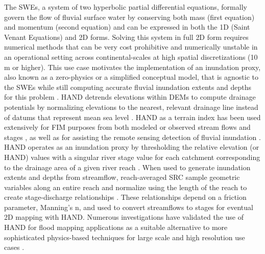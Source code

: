 \documentclass[preprint,review,12pt]{dependencies/elsarticle}
\begin{document}
The \acp{SWE}, a system of two hyperbolic partial differential equations, formally govern the flow of fluvial surface water by conserving both mass (first equation) and momentum (second equation) and can be expressed in both the \ac{1D} (Saint Venant Equations) and \ac{2D} forms.
Solving this system in full \ac{2D} form requires numerical methods that can be very cost prohibitive and numerically unstable in an operational setting across continental-scales at high spatial discretizations (10 \ac{m} or higher).
This use case motivates the implementation of an inundation proxy, also known as a zero-physics or a simplified conceptual model, that is agnostic to the \acp{SWE} while still computing accurate fluvial inundation extents and depths for this problem \citep{teng2015rapid}.
\ac{HAND} detrends elevations within \acp{DEM} to compute drainage potentials by normalizing elevations to the nearest, relevant drainage line instead of datums that represent mean sea level \citep{renno2008hand,nobre2011height,nobre2016hand}.
\ac{HAND} as a terrain index has been used extensively for \ac{FIM} purposes from both modeled or observed stream flows and stages \citep{nobre2016hand,afshari2018comparison,garousi2019terrain,johnson2019integrated,zheng2018geoflood,zheng2018river,zhang2018comparative,teng2015rapid,li2022accounting,li2020evaluation}, as well as for assisting the remote sensing detection of fluvial inundation \citep{aristizabal2020high,shastry2019using,aristizabal2021mapping,huang2017comparison,twele2016sentinel}.
\ac{HAND} operates as an inundation proxy by thresholding the relative elevation (or \ac{HAND}) values with a singular river stage value for each catchment corresponding to the drainage area of a given river reach \citep{nobre2016hand,garousi2019terrain,johnson2019integrated,zheng2018geoflood,teng2015rapid,li2020evaluation,liu2016cybergis,maidment2017conceptual,liu2018cybergis,liu2020height,liu2018review}.
When used to generate inundation extents and depths from streamflow, reach-averaged \ac{SRC} sample geometric variables along an entire reach and normalize using the length of the reach to create stage-discharge relationships \citep{zheng2018river,aristizabal2022reducing,godbout2019error}.
These relationships depend on a friction parameter, Manning's n, and used to convert streamflows to stages for eventual \ac{2D} mapping with \ac{HAND}.
Numerous investigations have validated the use of \ac{HAND} for flood mapping applications as a suitable alternative to more sophisticated physics-based techniques for large scale and high resolution use cases \citep{johnson2019integrated,li2020evaluation,li2022comparative,aristizabal2022reducing,nobre2016hand,godbout2019error,afshari2018comparison,zhang2018comparative,teng2015rapid,teng2017flood,diehl2021improving,hocini2021performance}.
\end{document}
